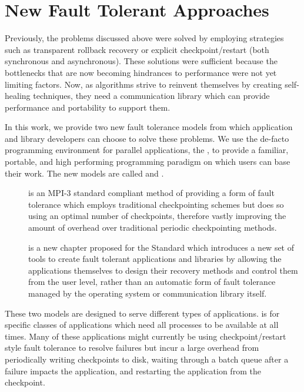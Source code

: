 \section{New Fault Tolerant Approaches}\label{sect:intro:newft}

Previously, the problems discussed above were solved by employing strategies such 
as transparent rollback recovery or explicit checkpoint/restart (both 
synchronous and asynchronous). These solutions were sufficient because the 
bottlenecks that are now becoming hindrances to performance were not yet 
limiting factors. Now, as algorithms strive to reinvent themselves by creating 
self-healing techniques, they need a communication library which can provide 
performance and portability to support them.

In this work, we provide two new fault tolerance models from which application and 
library developers can choose to solve these problems. We use the de-facto
programming environment for parallel applications, the \mpi, to provide a
familiar, portable, and high performing programming paradigm on which users can
base their work. The new models are called \cof and \ulfm.

\begin{description}

\item[\cof]{\cof is an MPI-3 standard compliant method of providing a form of fault
tolerance which employs traditional checkpointing schemes but does so using an
optimal number of checkpoints, therefore vastly improving the amount of overhead
over traditional periodic checkpointing methods.}

\item[\ulfm]{\ulfm is a new chapter proposed for the \mpi Standard which introduces a new set
of tools to create fault tolerant applications and libraries by allowing the
applications themselves to design their recovery methods and control them from
the user level, rather than an automatic form of fault tolerance managed by the
operating system or communication library itself.}

\end{description}

These two models are designed to serve different types of applications. \cof is 
for specific classes of applications which need all processes to be available at 
all times. Many of these applications might currently be using checkpoint/restart 
style fault tolerance to resolve failures but incur a large overhead 
from periodically writing checkpoints to disk, waiting through a batch queue 
after a failure impacts the application, and restarting the application from the 
checkpoint. 

